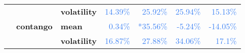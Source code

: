 \documentclass[
  authoryear,
  preprint,
  3p]{elsarticle}
\begin{document}
\begin{longtable}[t]{>{}l>{}l>{}l>{}r>{}r>{}r>{}r}
\textbf{} & \textbf{} & \textbf{volatility} & \textcolor[HTML]{4285f4}{14.39\%} & \textcolor[HTML]{4285f4}{25.92\%} & \textcolor[HTML]{4285f4}{25.94\%} & \textcolor[HTML]{4285f4}{15.13\%}\\
\addlinespace
\textbf{} & \textbf{contango} & \textbf{mean} & \textcolor[HTML]{4285f4}{0.34\%} & \textcolor[HTML]{4285f4}{*35.56\%} & \textcolor[HTML]{4285f4}{-5.24\%} & \textcolor[HTML]{4285f4}{-14.05\%}\\
\textbf{} & \textbf{} & \textbf{volatility} & \textcolor[HTML]{4285f4}{16.87\%} & \textcolor[HTML]{4285f4}{27.88\%} & \textcolor[HTML]{4285f4}{34.06\%} & \textcolor[HTML]{4285f4}{17.1\%}\\
\bottomrule

\end{longtable}

\endgroup{}

\newpage

\begingroup\fontsize{7}{9}\selectfont
\end{document}

